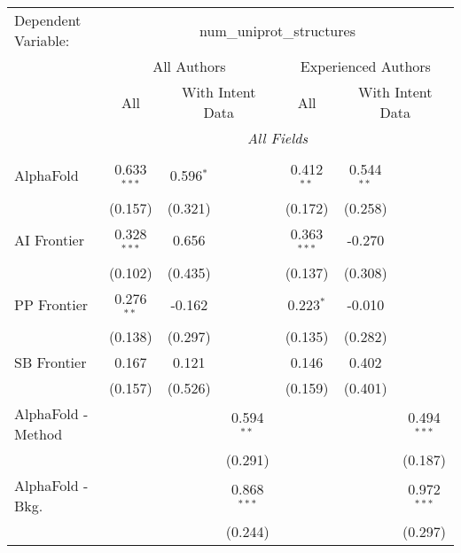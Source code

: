 \begingroup
\centering
\begin{tabular}{lcccccc}
   \tabularnewline \midrule \midrule
   Dependent Variable: & \multicolumn{6}{c}{num\_uniprot\_structures}\\
 & \multicolumn{3}{c}{All Authors} & \multicolumn{3}{c}{Experienced Authors} \\
\cmidrule(lr){2-4} \cmidrule(lr){5-7}
 & \multicolumn{1}{c}{All} & \multicolumn{2}{c}{With Intent Data} & \multicolumn{1}{c}{All} & \multicolumn{2}{c}{With Intent Data} \\
\cmidrule(lr){2-2} \cmidrule(lr){3-4} \cmidrule(lr){5-5} \cmidrule(lr){6-7}
 & \multicolumn{6}{c}{\textit{All Fields}} \\ \\
   AlphaFold            & 0.633$^{***}$ & 0.596$^{*}$ &                & 0.412$^{**}$  & 0.544$^{**}$ &   \\   
                        & (0.157)       & (0.321)     &                & (0.172)       & (0.258)      &   \\   
   AI Frontier          & 0.328$^{***}$ & 0.656       &                & 0.363$^{***}$ & -0.270       &   \\   
                        & (0.102)       & (0.435)     &                & (0.137)       & (0.308)      &   \\   
   PP Frontier          & 0.276$^{**}$  & -0.162      &                & 0.223$^{*}$   & -0.010       &   \\   
                        & (0.138)       & (0.297)     &                & (0.135)       & (0.282)      &   \\   
   SB Frontier          & 0.167         & 0.121       &                & 0.146         & 0.402        &   \\   
                        & (0.157)       & (0.526)     &                & (0.159)       & (0.401)      &   \\   
   AlphaFold - Method   &               &             & 0.594$^{**}$   &               &              & 0.494$^{***}$\\   
                        &               &             & (0.291)        &               &              & (0.187)\\   
   AlphaFold - Bkg.     &               &             & 0.868$^{***}$  &               &              & 0.972$^{***}$\\   
                        &               &             & (0.244)        &               &              & (0.297)\\   

\end{tabular}
